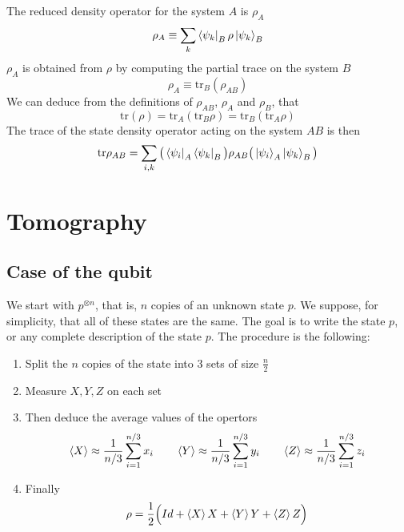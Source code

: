 \documentclass{article}
\begin{document}
The reduced density operator for the system $A$ is $\rho_A$
\begin{equation}
    \rho_A \equiv
    \sum_k \bra{\psi_k}_B\rho\ket{\psi_k}_B
\end{equation}
$\rho_A$ is obtained from $\rho$ by computing the partial trace on the system
$B$
\begin{equation}
    \rho_A \equiv \text{tr}_B(\rho_{AB})
\end{equation}
We can deduce from the definitions of $\rho_{AB}$, $\rho_A$ and $\rho_B$, that
\begin{equation}
    \text{tr}(\rho) = \text{tr}_A(\text{tr}_B\rho) =
    \text{tr}_B(\text{tr}_A\rho)
\end{equation}
The trace of the state density operator acting on the system $AB$ is then
\begin{equation}
    \text{tr}\rho_{AB} =
    \sum_{i,k} \big(\bra{\psi_i}_A\bra{\psi_k}_B\big)\rho_{AB}\big(\ket{\psi_i}_A\ket{\psi_k}_B\big)
\end{equation}

\section{Tomography}
\subsection{Case of the qubit}
We start with $p^{\otimes n}$, that is, $n$ copies of an unknown state $p$. We
suppose, for simplicity, that all of these states are the same. The goal is to
write the state $p$, or any complete description of the state $p$. The procedure
is the following:
\begin{enumerate}
    \item Split the $n$ copies of the state into 3 sets of size $\frac{n}{2}$
    \item Measure $X, Y, Z$ on each set
    \item Then deduce the average values of the opertors
    \begin{equation}
        \braket{X} \approx \frac{1}{n/3}\sum_{i=1}^{n/3} x_i \qquad
        \braket{Y} \approx \frac{1}{n/3}\sum_{i=1}^{n/3} y_i \qquad
        \braket{Z} \approx \frac{1}{n/3}\sum_{i=1}^{n/3} z_i
    \end{equation}
    \item Finally
    \begin{equation}
        \rho = \frac{1}{2}\Big(Id + \braket{X}X+\braket{Y}Y+ \braket{Z}Z\Big)
    \end{equation}
\end{enumerate}
\end{document}
